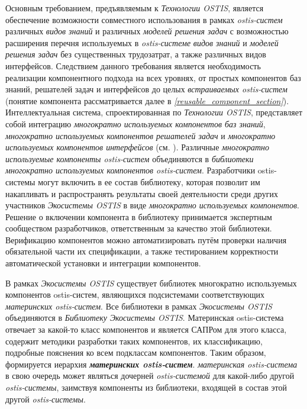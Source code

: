 Основным требованием, предъявляемым к \textit{Технологии OSTIS}, является обеспечение возможности совместного использования в рамках \textit{ostis-систем} различных \textit{видов знаний} и различных \textit{моделей решения задач} с возможностью  расширения перечня используемых в \textit{ostis-системе} \textit{видов знаний} и \textit{моделей решения задач} без существенных трудозатрат, а также различных видов интерфейсов. Следствием данного требования является необходимость реализации компонентного подхода на всех уровнях, от простых компонентов баз знаний, решателей задач и интерфейсов до целых \textit{встраиваемых ostis-систем} (понятие компонента рассматривается далее в \textit{\ref{reusable_component_section}}). Интеллектуальная система, спроектированная по \textit{Технологии OSTIS}, представляет собой интеграцию \textit{многократно используемых компонентов баз знаний}, \textit{многократно используемых компонентов решателей задач} и \textit{многократно используемых компонентов интерфейсов} (см. ). Различные \textit{многократно используемые компоненты ostis-систем} объединяются в \textit{библиотеки многократно используемых компонентов ostis-систем}. Разработчики  ostis-системы могут включить в ее состав библиотеку, которая позволит им накапливать и распространять результаты своей деятельности среди других участников \textit{Экосистемы OSTIS} в виде \textit{многократно используемых компонентов}. Решение о включении компонента в библиотеку принимается экспертным сообществом разработчиков, ответственным за качество этой библиотеки. Верификацию компонентов можно автоматизировать путём проверки наличия обязательной части их спецификации, а также тестированием корректности автоматической установки и интеграции компонентов.

В рамках \textit{Экосистемы OSTIS} существует  библиотек многократно используемых компонентов ostis-систем, являющихся подсистемами соответствующих \textit{материнских ostis-систем}. Все библиотеки в рамках \textit{Экосистемы OSTIS} объединяются в \textit{Библиотеку Экосистемы OSTIS}. Материнская ostis-система отвечает за какой-то класс компонентов и является САПРом для этого класса, содержит методики разработки таких компонентов, их классификацию, подробные пояснения ко всем подклассам компонентов. Таким образом, формируется иерархия \textbf{\textit{материнских ostis-систем}}. \textit{материнская ostis-система} в свою очередь может являться дочерней \textit{ostis-системой} для какой-либо другой \textit{ostis-системы}, заимствуя компоненты из библиотеки, входящей в состав этой другой \textit{ostis-системы}.

